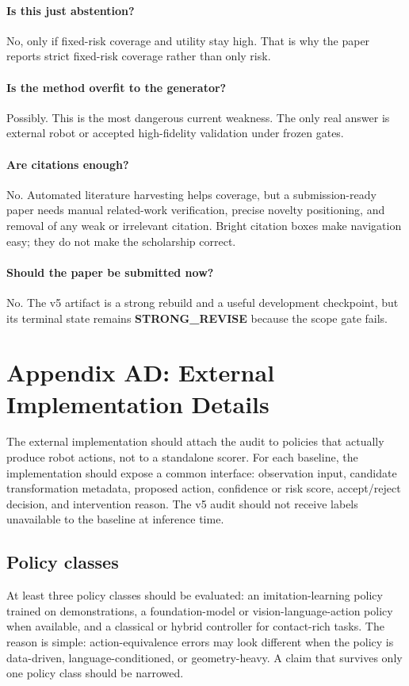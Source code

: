\documentclass{article}
\begin{document}
\paragraph{Is this just abstention?} No, only if fixed-risk coverage and utility stay high. That is why the paper reports strict fixed-risk coverage rather than only risk.

\paragraph{Is the method overfit to the generator?} Possibly. This is the most dangerous current weakness. The only real answer is external robot or accepted high-fidelity validation under frozen gates.

\paragraph{Are citations enough?} No. Automated literature harvesting helps coverage, but a submission-ready paper needs manual related-work verification, precise novelty positioning, and removal of any weak or irrelevant citation. Bright citation boxes make navigation easy; they do not make the scholarship correct.

\paragraph{Should the paper be submitted now?} No. The v5 artifact is a strong rebuild and a useful development checkpoint, but its terminal state remains \textbf{STRONG\_REVISE} because the scope gate fails.


\section{Appendix AD: External Implementation Details}
The external implementation should attach the audit to policies that actually produce robot actions, not to a standalone scorer. For each baseline, the implementation should expose a common interface: observation input, candidate transformation metadata, proposed action, confidence or risk score, accept/reject decision, and intervention reason. The v5 audit should not receive labels unavailable to the baseline at inference time.

\subsection{Policy classes}
At least three policy classes should be evaluated: an imitation-learning policy trained on demonstrations, a foundation-model or vision-language-action policy when available, and a classical or hybrid controller for contact-rich tasks. The reason is simple: action-equivalence errors may look different when the policy is data-driven, language-conditioned, or geometry-heavy. A claim that survives only one policy class should be narrowed.
\end{document}
